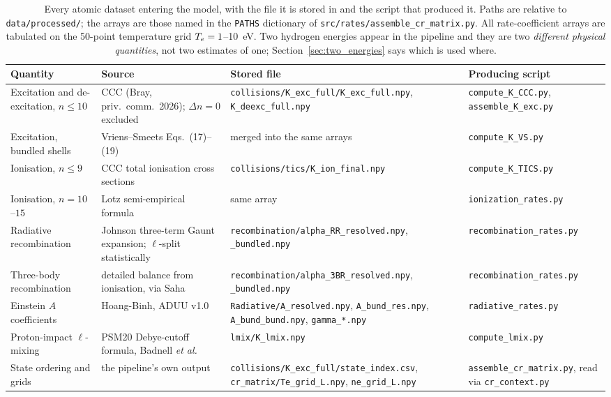 \begin{table}[tbp]
  \centering
  \caption[Atomic data sources]{Every atomic dataset entering the model, with
  the file it is stored in and the script that produced it. Paths are relative
  to \texttt{data/processed/}; the arrays are those named in the \texttt{PATHS}
  dictionary of \texttt{src/rates/assemble\_cr\_matrix.py}. All rate-coefficient
  arrays are tabulated on the 50-point temperature grid
  $T_e = 1$--\SI{10}{\electronvolt}. Two hydrogen energies appear in the
  pipeline and they are two \emph{different physical quantities}, not two
  estimates of one; Section~\ref{sec:two_energies} says which is used where.}
  \label{tab:data_sources}
  \small
  \begin{tabular}{p{}p{}p{}p{}}
    \toprule
    Quantity & Source & Stored file & Producing script \\
    \midrule
    Excitation and de-excitation, $n \le 10$ &
      CCC (Bray, priv.\ comm.\ 2026); $\Delta n = 0$ excluded &
      \texttt{collisions/K\_exc\_full/K\_exc\_full.npy}, \texttt{K\_deexc\_full.npy} &
      \texttt{compute\_K\_CCC.py}, \texttt{assemble\_K\_exc.py} \\
    Excitation, bundled shells &
      Vriens--Smeets Eqs.~(17)--(19) &
      merged into the same arrays &
      \texttt{compute\_K\_VS.py} \\
    Ionisation, $n \le 9$ &
      CCC total ionisation cross sections &
      \texttt{collisions/tics/K\_ion\_final.npy} &
      \texttt{compute\_K\_TICS.py} \\
    Ionisation, $n = 10$--$15$ &
      Lotz semi-empirical formula &
      same array &
      \texttt{ionization\_rates.py} \\
    Radiative recombination &
      Johnson three-term Gaunt expansion; $\ell$-split statistically &
      \texttt{recombination/alpha\_RR\_resolved.npy}, \texttt{\_bundled.npy} &
      \texttt{recombination\_rates.py} \\
    Three-body recombination &
      detailed balance from ionisation, via Saha &
      \texttt{recombination/alpha\_3BR\_resolved.npy}, \texttt{\_bundled.npy} &
      \texttt{recombination\_rates.py} \\
    Einstein $A$ coefficients &
      Hoang-Binh, ADUU v1.0 &
      \texttt{Radiative/A\_resolved.npy}, \texttt{A\_bund\_res.npy}, \texttt{A\_bund\_bund.npy}, \texttt{gamma\_*.npy} &
      \texttt{radiative\_rates.py} \\
    Proton-impact $\ell$-mixing &
      PSM20 Debye-cutoff formula, Badnell \emph{et al.} &
      \texttt{lmix/K\_lmix.npy} &
      \texttt{compute\_lmix.py} \\
    State ordering and grids &
      the pipeline's own output &
      \texttt{collisions/K\_exc\_full/state\_index.csv}, \texttt{cr\_matrix/Te\_grid\_L.npy}, \texttt{ne\_grid\_L.npy} &
      \texttt{assemble\_cr\_matrix.py}, read via \texttt{cr\_context.py} \\
    \bottomrule
  \end{tabular}
\end{table}

